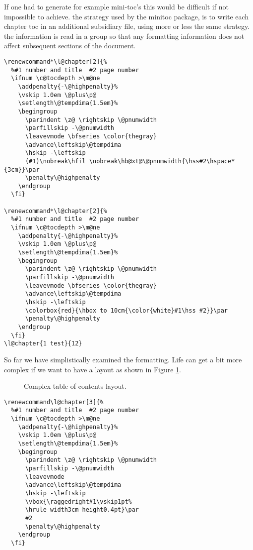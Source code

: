 If one had to generate for example mini-toc's this would be difficult if not impossible to achieve. the strategy used by the minitoc package, is to write each chapter toc in an additional subsidiary file, using more or less the same strategy. the information is read in a group so that any formatting information does not affect subsequent sections of the document.

\begin{tcolorbox}
\begin{lstlisting}
\renewcommand*\l@chapter[2]{%
  %#1 number and title  #2 page number
  \ifnum \c@tocdepth >\m@ne
    \addpenalty{-\@highpenalty}%
    \vskip 1.0em \@plus\p@
    \setlength\@tempdima{1.5em}%
    \begingroup
      \parindent \z@ \rightskip \@pnumwidth
      \parfillskip -\@pnumwidth
      \leavevmode \bfseries \color{thegray}
      \advance\leftskip\@tempdima
      \hskip -\leftskip
      (#1)\nobreak\hfil \nobreak\hb@xt@\@pnumwidth{\hss#2\hspace*{3cm}}\par
      \penalty\@highpenalty
    \endgroup
  \fi}

\renewcommand*\l@chapter[2]{%
  %#1 number and title  #2 page number
  \ifnum \c@tocdepth >\m@ne
    \addpenalty{-\@highpenalty}%
    \vskip 1.0em \@plus\p@
    \setlength\@tempdima{1.5em}%
    \begingroup
      \parindent \z@ \rightskip \@pnumwidth
      \parfillskip -\@pnumwidth
      \leavevmode \bfseries \color{thegray}
      \advance\leftskip\@tempdima
      \hskip -\leftskip
      \colorbox{red}{\hbox to 10cm{\color{white}#1\hss #2}}\par
      \penalty\@highpenalty
    \endgroup
  \fi}
\l@chapter{1 test}{12}
\end{lstlisting}
\end{tcolorbox}


So far we have simplistically examined the formatting. Life can get a bit more complex if we want to have a layout as shown in Figure \ref{fig:toc}.

\begin{figure}[tp]
\caption{Complex table of contents layout.}
\label{fig:toc}
\end{figure}


\begin{lstlisting}
\renewcommand\l@chapter[3]{%
  %#1 number and title  #2 page number
  \ifnum \c@tocdepth >\m@ne
    \addpenalty{-\@highpenalty}%
    \vskip 1.0em \@plus\p@
    \setlength\@tempdima{1.5em}%
    \begingroup
      \parindent \z@ \rightskip \@pnumwidth
      \parfillskip -\@pnumwidth
      \leavevmode
      \advance\leftskip\@tempdima
      \hskip -\leftskip
      \vbox{\raggedright#1\vskip1pt%
      \hrule width3cm height0.4pt}\par
      #2
      \penalty\@highpenalty
    \endgroup
  \fi}
\end{lstlisting}

